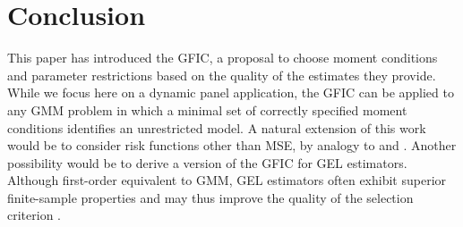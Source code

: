 
\section{Conclusion}
\label{sec:conclude}
This paper has introduced the GFIC, a proposal to choose moment conditions and parameter restrictions based on the quality of the estimates they provide. 
While we focus here on a dynamic panel application, the GFIC can be applied to any GMM problem in which a minimal set of correctly specified moment conditions identifies an unrestricted model. 
A natural extension of this work would be to consider risk functions other than MSE, by analogy to \cite{ClaeskensCroux2006} and \cite{ClaeskensHjort2008}.
Another possibility would be to derive a version of the GFIC for GEL estimators. 
Although first-order equivalent to GMM, GEL estimators often exhibit superior finite-sample properties and may thus improve the quality of the selection criterion \citep{NeweySmith}. 

